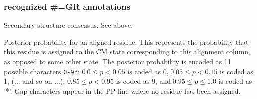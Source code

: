\subsubsection{recognized \#=GR annotations}
\begin{sreitems}{}
\item [\emprog{SS}]
        Secondary structure consensus. See 
        above.

\item [\emprog{PP}] Posterior probability for an aligned residue. This
  represents the probability that this residue is assigned to the CM
  state corresponding to this alignment column, as opposed to some
  other state. The posterior
  probability is encoded as 11 possible characters \verb+0-9*+: $0.0
  \leq p < 0.05$ is coded as 0, $0.05 \leq p < 0.15$ is coded as 1,
  (... and so on ...), $0.85 \leq p < 0.95$ is coded as 9, and $0.95
  \leq p \leq 1.0$ is coded as '*'. Gap characters appear in the PP
  line where no residue has been assigned.
\end{sreitems}


